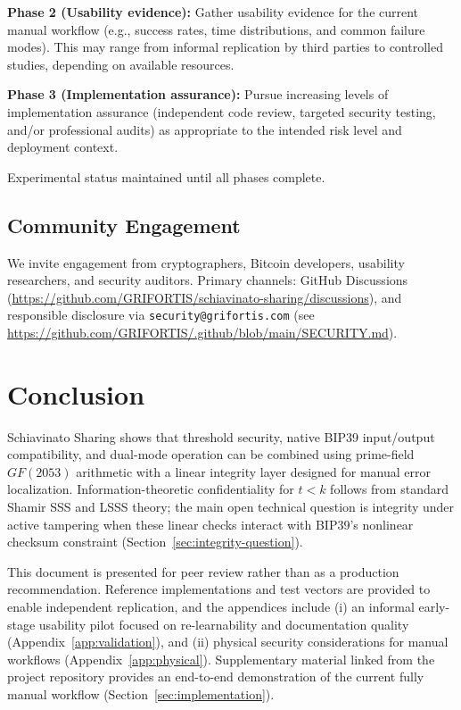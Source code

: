 \documentclass[11pt]{article}
\begin{document}
\textbf{Phase 2 (Usability evidence):} Gather usability evidence for the current manual workflow (e.g., success rates, time distributions, and common failure modes). This may range from informal replication by third parties to controlled studies, depending on available resources.

\textbf{Phase 3 (Implementation assurance):} Pursue increasing levels of implementation assurance (independent code review, targeted security testing, and/or professional audits) as appropriate to the intended risk level and deployment context.

Experimental status maintained until all phases complete.

\subsection{Community Engagement}

We invite engagement from cryptographers, Bitcoin developers, usability researchers, and security auditors. Primary channels: GitHub Discussions (\url{https://github.com/GRIFORTIS/schiavinato-sharing/discussions}), and responsible disclosure via \texttt{security@grifortis.com} (see \url{https://github.com/GRIFORTIS/.github/blob/main/SECURITY.md}).

\section{Conclusion}
\label{sec:conclusion}

Schiavinato Sharing shows that threshold security, native BIP39 input/output compatibility, and dual-mode operation can be combined using prime-field $GF(2053)$ arithmetic with a linear integrity layer designed for manual error localization. Information-theoretic confidentiality for $t<k$ follows from standard Shamir SSS and LSSS theory; the main open technical question is integrity under active tampering when these linear checks interact with BIP39's nonlinear checksum constraint (Section~\ref{sec:integrity-question}).

This document is presented for peer review rather than as a production recommendation. Reference implementations and test vectors are provided to enable independent replication, and the appendices include (i) an informal early-stage usability pilot focused on re-learnability and documentation quality (Appendix~\ref{app:validation}), and (ii) physical security considerations for manual workflows (Appendix~\ref{app:physical}). Supplementary material linked from the project repository provides an end-to-end demonstration of the current fully manual workflow (Section~\ref{sec:implementation}).
\end{document}
